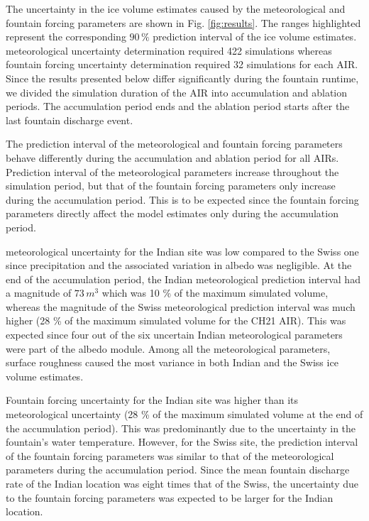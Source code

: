 The uncertainty in the ice volume estimates caused by the meteorological and fountain forcing parameters are shown in
Fig. \ref{fig:results}. The ranges highlighted represent the corresponding $90\,\%$ prediction interval of the
ice volume estimates. meteorological uncertainty determination required 422 simulations whereas fountain forcing
uncertainty determination required 32 simulations for each AIR. Since the results presented below differ
significantly during the fountain runtime, we divided the simulation duration of the AIR into accumulation and
ablation periods. The accumulation period ends and the ablation period starts after the last fountain discharge event.


The prediction interval of the meteorological and fountain forcing parameters behave differently during the
accumulation and ablation period for all \ac{AIRs}. Prediction interval of the meteorological parameters increase
throughout the simulation period, but that of the fountain forcing parameters only increase during the
accumulation period. This is to be expected since the fountain forcing parameters directly affect the model
estimates only during the accumulation period.

meteorological uncertainty for the Indian site was low compared to the Swiss one since precipitation and the associated
variation in albedo was negligible. At the end of the accumulation period, the Indian meteorological prediction
interval had a magnitude of  $73\,m^3$ which was 10 \% of the maximum simulated volume, whereas the magnitude of
the Swiss meteorological prediction interval was much higher (28 \% of the maximum simulated volume for the CH21 AIR).
This was expected since four out of the six uncertain Indian meteorological parameters were part of the albedo module. Among
all the meteorological parameters, surface roughness caused the most variance in both Indian and the Swiss ice
volume estimates.

Fountain forcing uncertainty for the Indian site was higher than its meteorological uncertainty (28 \% of the maximum
simulated volume at the end of the accumulation period). This was predominantly due to the uncertainty in the
fountain's water temperature. However, for the Swiss site, the prediction interval of the fountain forcing
parameters was similar to that of the meteorological parameters during the accumulation period. Since the mean fountain
discharge rate of the Indian location was eight times that of the Swiss, the uncertainty due to the fountain
forcing parameters was expected to be larger for the Indian location.

